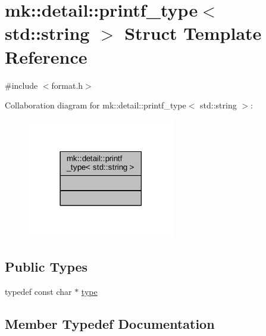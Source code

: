 \hypertarget{structmk_1_1detail_1_1printf__type_3_01std_1_1string_01_4}{}\section{mk\+:\+:detail\+:\+:printf\+\_\+type$<$ std\+:\+:string $>$ Struct Template Reference}
\label{structmk_1_1detail_1_1printf__type_3_01std_1_1string_01_4}


{\ttfamily \#include $<$format.\+h$>$}



Collaboration diagram for mk\+:\+:detail\+:\+:printf\+\_\+type$<$ std\+:\+:string $>$\+:
\nopagebreak
\begin{figure}[H]
\begin{center}
\leavevmode
\includegraphics[width=182pt]{structmk_1_1detail_1_1printf__type_3_01std_1_1string_01_4__coll__graph}
\end{center}
\end{figure}
\subsection*{Public Types}
\begin{DoxyCompactItemize}
\item 
typedef const char $\ast$ \hyperlink{structmk_1_1detail_1_1printf__type_3_01std_1_1string_01_4_aefe1f893104e234da2167836c168deef}{type}
\end{DoxyCompactItemize}


\subsection{Member Typedef Documentation}
